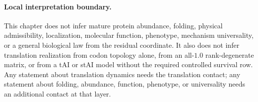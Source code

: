 \paragraph{Local interpretation boundary.}
This chapter does not infer mature protein abundance, folding, physical admissibility, localization, molecular function, phenotype, mechanism universality, or a general biological law from the residual coordinate. It also does not infer translation realization from codon topology alone, from an all-$1.0$ rank-degenerate matrix, or from a tAI or stAI model without the required controlled survival row. Any statement about translation dynamics needs the translation contact; any statement about folding, abundance, function, phenotype, or universality needs an additional contact at that layer.
